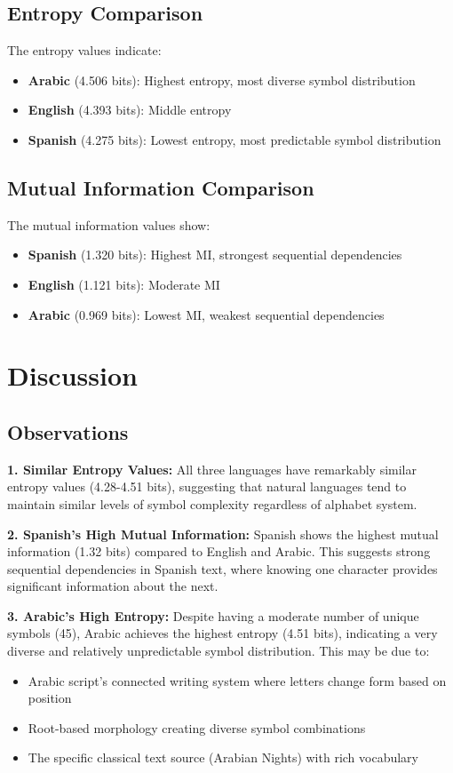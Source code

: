 \documentclass[12pt]{article}
\begin{document}
\subsection{Entropy Comparison}
The entropy values indicate:
\begin{itemize}
    \item \textbf{Arabic} (4.506 bits): Highest entropy, most diverse symbol distribution
    \item \textbf{English} (4.393 bits): Middle entropy
    \item \textbf{Spanish} (4.275 bits): Lowest entropy, most predictable symbol distribution
\end{itemize}

\subsection{Mutual Information Comparison}
The mutual information values show:
\begin{itemize}
    \item \textbf{Spanish} (1.320 bits): Highest MI, strongest sequential dependencies
    \item \textbf{English} (1.121 bits): Moderate MI
    \item \textbf{Arabic} (0.969 bits): Lowest MI, weakest sequential dependencies
\end{itemize}

\section{Discussion}

\subsection{Observations}

\textbf{1. Similar Entropy Values:} All three languages have remarkably similar entropy values (4.28-4.51 bits), suggesting that natural languages tend to maintain similar levels of symbol complexity regardless of alphabet system.

\textbf{2. Spanish's High Mutual Information:} Spanish shows the highest mutual information (1.32 bits) compared to English and Arabic. This suggests strong sequential dependencies in Spanish text, where knowing one character provides significant information about the next.

\textbf{3. Arabic's High Entropy:} Despite having a moderate number of unique symbols (45), Arabic achieves the highest entropy (4.51 bits), indicating a very diverse and relatively unpredictable symbol distribution. This may be due to:
\begin{itemize}
    \item Arabic script's connected writing system where letters change form based on position
    \item Root-based morphology creating diverse symbol combinations
    \item The specific classical text source (Arabian Nights) with rich vocabulary
\end{itemize}
\end{document}
